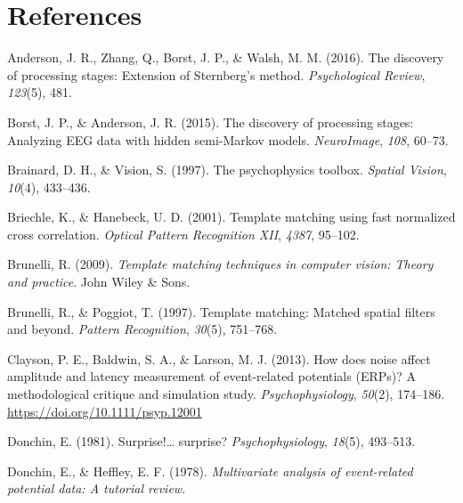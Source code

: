 \documentclass[
  man]{apa7}
\newlength{\cslhangindent}
\newlength{\cslentryspacingunit} %
\newenvironment{CSLReferences}[2] %
 {%
  \setlength{\parindent}{0pt}
  \ifodd #1
  \let\oldpar\par
  \def\par{\hangindent=\cslhangindent\oldpar}
  \fi
  \setlength{\parskip}{#2\cslentryspacingunit}
 }%
 {}
\begin{document}
\newpage

\hypertarget{references}{%
\section{References}\label{references}}

\hypertarget{refs}{}
\begin{CSLReferences}{1}{0}
\leavevmode{}%
Anderson, J. R., Zhang, Q., Borst, J. P., \& Walsh, M. M. (2016). The discovery of processing stages: {Extension} of {Sternberg}'s method. \emph{Psychological Review}, \emph{123}(5), 481.

\leavevmode{}%
Borst, J. P., \& Anderson, J. R. (2015). The discovery of processing stages: {Analyzing} {EEG} data with hidden semi-{Markov} models. \emph{NeuroImage}, \emph{108}, 60--73.

\leavevmode{}%
Brainard, D. H., \& Vision, S. (1997). The psychophysics toolbox. \emph{Spatial Vision}, \emph{10}(4), 433--436.

\leavevmode{}%
Briechle, K., \& Hanebeck, U. D. (2001). Template matching using fast normalized cross correlation. \emph{Optical Pattern Recognition {XII}}, \emph{4387}, 95--102.

\leavevmode{}%
Brunelli, R. (2009). \emph{Template matching techniques in computer vision: Theory and practice}. John Wiley \& Sons.

\leavevmode{}%
Brunelli, R., \& Poggiot, T. (1997). Template matching: {Matched} spatial filters and beyond. \emph{Pattern Recognition}, \emph{30}(5), 751--768.

\leavevmode{}%
Clayson, P. E., Baldwin, S. A., \& Larson, M. J. (2013). How does noise affect amplitude and latency measurement of event-related potentials ({ERPs})? {A} methodological critique and simulation study. \emph{Psychophysiology}, \emph{50}(2), 174--186. \url{https://doi.org/10.1111/psyp.12001}

\leavevmode{}%
Donchin, E. (1981). Surprise!\ldots{} surprise? \emph{Psychophysiology}, \emph{18}(5), 493--513.

\leavevmode{}%
Donchin, E., \& Heffley, E. F. (1978). \emph{Multivariate analysis of event-related potential data: {A} tutorial review}.


\end{CSLReferences}
\end{document}
